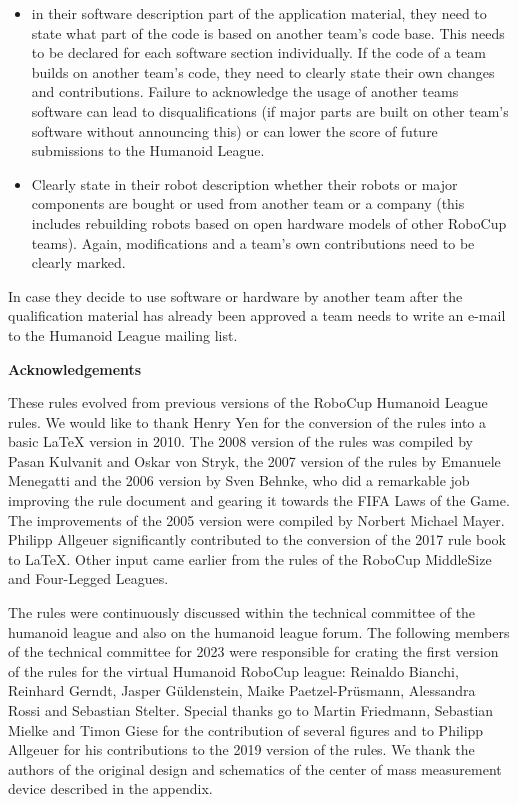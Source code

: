       \begin{itemize}
      \item in their software description part of the application material, they need to state what part of the code is based on another team's code base. This needs to be declared for each software section individually. If the code of a team builds on another team's code, they need to clearly state their own changes and contributions. Failure to acknowledge the usage of another teams software can lead to disqualifications (if major parts are built on other team's software without announcing this) or can lower the score of future submissions to the Humanoid League.
      \item Clearly state in their robot description whether their robots or major components are bought or used from another team or a company (this includes rebuilding robots based on open hardware models of other RoboCup teams). Again, modifications and a team's own contributions need to be clearly marked.
\end{itemize}
In case they decide to use software or hardware by another team after the qualification material has already been approved a team needs to write an e-mail to the Humanoid League mailing list.
      
      
\bigskip

{\bfseries Acknowledgements}

\headlinebox

These rules evolved from previous versions of the RoboCup Humanoid League rules. We would like to thank Henry Yen for the conversion of the rules into a basic LaTeX version in 2010. The 2008 version of the rules was compiled by Pasan Kulvanit and Oskar von Stryk, the 2007 version of the rules by Emanuele Menegatti and the 2006 version by Sven Behnke, who did a remarkable job improving the rule document and gearing it towards the FIFA Laws of the Game. The improvements of the 2005 version were compiled by Norbert Michael Mayer. Philipp Allgeuer significantly contributed to the conversion of the 2017 rule book to LaTeX.  Other input came earlier from the rules of the RoboCup MiddleSize and Four-Legged Leagues.

The rules were continuously discussed within the technical committee of the
humanoid league and also on the humanoid league forum.
The following members of the technical committee for 2023 were responsible for
crating the first version of the rules for the virtual Humanoid RoboCup league: Reinaldo Bianchi, Reinhard Gerndt, Jasper G\"{u}ldenstein, Maike Paetzel-Pr\"{u}smann, Alessandra Rossi and Sebastian Stelter.
Special thanks go to Martin Friedmann, Sebastian Mielke and Timon Giese for the
contribution of several figures and to Philipp Allgeuer for his contributions to
the 2019 version of the rules.
We thank the authors of the original design and schematics of the center
  of mass measurement device described in the appendix.
